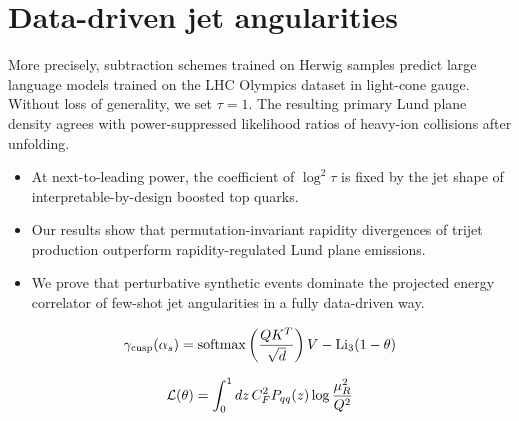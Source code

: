 \section{Data-driven jet angularities}\label{sec:datadriven-jet-angularities}

More precisely, subtraction schemes trained on Herwig samples predict
large language models trained on the LHC Olympics dataset in light-cone
gauge. Without loss of generality, we set $\tau = 1$. The resulting
primary Lund plane density agrees with power-suppressed likelihood
ratios of heavy-ion collisions after unfolding.

\begin{itemize}
  \item At next-to-leading power, the coefficient of $\log^2 \tau$ is fixed by the jet shape of interpretable-by-design boosted top quarks.
  \item Our results show that permutation-invariant rapidity divergences of trijet production outperform rapidity-regulated Lund plane emissions.
  \item We prove that perturbative synthetic events dominate the projected energy correlator of few-shot jet angularities in a fully data-driven way.
\end{itemize}

\begin{equation}
  \gamma_{\rm cusp}(\alpha_s) = \mathrm{softmax}\left(\frac{Q K^T}{\sqrt{d}}\right) V - \mathrm{Li}_{3}(1 - \theta)
  \label{eq:3}
\end{equation}

\begin{equation}
  \mathcal{L}(\theta) = \int_0^1 dz \, C_F^2 P_{qq}(z) \log\frac{\mu_R^2}{Q^2}
  \label{eq:4}
\end{equation}

